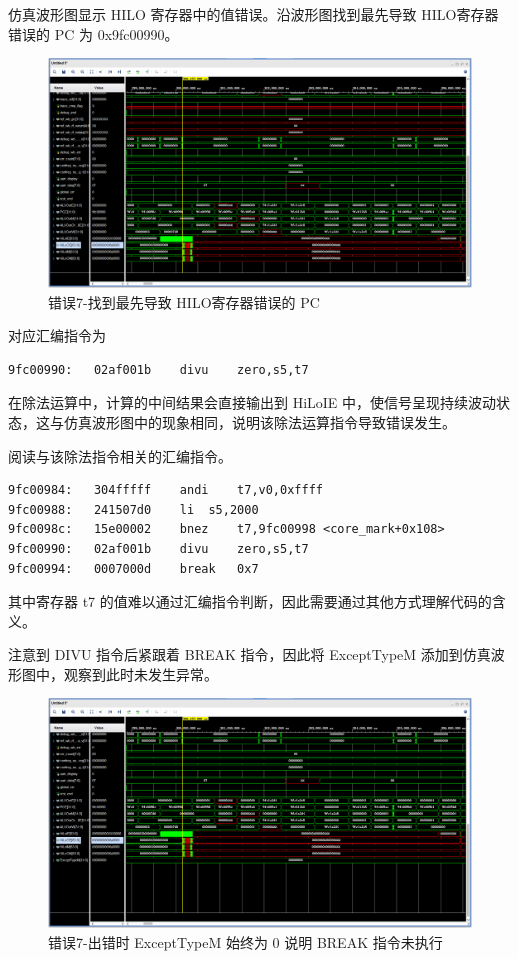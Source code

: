 \begin{enumerate}[(1)]
仿真波形图显示 HILO 寄存器中的值错误。沿波形图找到最先导致 HILO寄存器错误的 PC 为 0x9fc00990。

\begin{figure}[H]
    \centering
    \includegraphics[width=\textwidth]{image/错误7-分析定位过程2.png}
    \caption{错误7-找到最先导致 HILO寄存器错误的 PC}
    \label{fig:错误7-分析定位过程2}
\end{figure}

对应汇编指令为

\begin{lstlisting}
9fc00990:	02af001b 	divu	zero,s5,t7
\end{lstlisting}

在除法运算中，计算的中间结果会直接输出到 HiLoIE 中，使信号呈现持续波动状态，这与仿真波形图中的现象相同，说明该除法运算指令导致错误发生。

阅读与该除法指令相关的汇编指令。

\begin{lstlisting}
9fc00984:	304fffff 	andi	t7,v0,0xffff
9fc00988:	241507d0 	li	s5,2000
9fc0098c:	15e00002 	bnez	t7,9fc00998 <core_mark+0x108>
9fc00990:	02af001b 	divu	zero,s5,t7
9fc00994:	0007000d 	break	0x7
\end{lstlisting}

其中寄存器 t7 的值难以通过汇编指令判断，因此需要通过其他方式理解代码的含义。

注意到 DIVU 指令后紧跟着 BREAK 指令，因此将 ExceptTypeM 添加到仿真波形图中，观察到此时未发生异常。

\begin{figure}[H]
    \centering
    \includegraphics[width=\textwidth]{image/错误7-分析定位过程3.png}
    \caption{错误7-出错时 ExceptTypeM 始终为 0 说明 BREAK 指令未执行}
    \label{fig:错误7-分析定位过程3}
\end{figure}


\end{enumerate}
